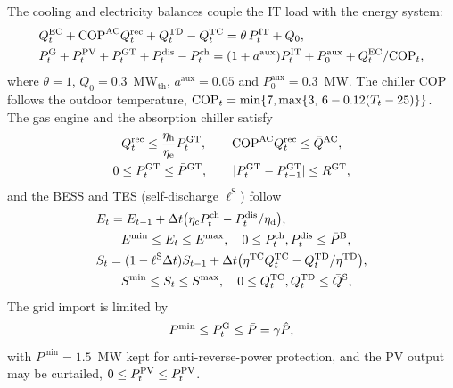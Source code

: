 The cooling and electricity balances couple the IT load with the energy system:
\begin{align}
&Q^{\mathrm{EC}}_t+\mathrm{COP}^{\mathrm{AC}}Q^{\mathrm{rec}}_t+Q^{\mathrm{TD}}_t-Q^{\mathrm{TC}}_t=\theta\,P^{\mathrm{IT}}_t+Q_0,\label{eq:cool}\\
&P^{\mathrm{G}}_t+P^{\mathrm{PV}}_t+P^{\mathrm{GT}}_t+P^{\mathrm{dis}}_t-P^{\mathrm{ch}}_t=(1+a^{\mathrm{aux}})P^{\mathrm{IT}}_t+P^{\mathrm{aux}}_0+Q^{\mathrm{EC}}_t/\mathrm{COP}_t,\label{eq:elec}
\end{align}
where $\theta=1$, $Q_0=0.3$~MW$_{\mathrm{th}}$, $a^{\mathrm{aux}}=0.05$ and $P^{\mathrm{aux}}_0=0.3$~MW. The chiller
COP follows the outdoor temperature, $\mathrm{COP}_t=\min\{7,\max\{3,\,6-0.12(T_t-25)\}\}$. The gas engine and the absorption
chiller satisfy
\begin{equation}
\begin{gathered}
Q^{\mathrm{rec}}_t\le\frac{\eta_{\mathrm{h}}}{\eta_{\mathrm{e}}}P^{\mathrm{GT}}_t,\qquad
\mathrm{COP}^{\mathrm{AC}}Q^{\mathrm{rec}}_t\le\bar Q^{\mathrm{AC}},\\
0\le P^{\mathrm{GT}}_t\le\bar P^{\mathrm{GT}},\qquad |P^{\mathrm{GT}}_t-P^{\mathrm{GT}}_{t-1}|\le R^{\mathrm{GT}},
\end{gathered}
\label{eq:gas}
\end{equation}
and the BESS and TES (self-discharge $\ell^{\mathrm{S}}$) follow
\begin{align}
&E_t=E_{t-1}+\Delta t\big(\eta_{\mathrm{c}}P^{\mathrm{ch}}_t-P^{\mathrm{dis}}_t/\eta_{\mathrm{d}}\big),\nonumber\\
&\qquad E^{\min}\le E_t\le E^{\max},\quad 0\le P^{\mathrm{ch}}_t,P^{\mathrm{dis}}_t\le\bar P^{\mathrm{B}},\label{eq:bess}\\
&S_t=(1-\ell^{\mathrm{S}}\Delta t)S_{t-1}+\Delta t\big(\eta^{\mathrm{TC}}Q^{\mathrm{TC}}_t-Q^{\mathrm{TD}}_t/\eta^{\mathrm{TD}}\big),\nonumber\\
&\qquad S^{\min}\le S_t\le S^{\max},\quad 0\le Q^{\mathrm{TC}}_t,Q^{\mathrm{TD}}_t\le\bar Q^{\mathrm{S}},\label{eq:tes}
\end{align}
The grid import is limited by
\begin{equation}
P^{\min}\le P^{\mathrm{G}}_t\le\bar P=\gamma\hat P ,
\label{eq:grid}
\end{equation}
with $P^{\min}=1.5$~MW kept for anti-reverse-power protection, and the PV output may be curtailed,
$0\le P^{\mathrm{PV}}_t\le\bar P^{\mathrm{PV}}_t$.

